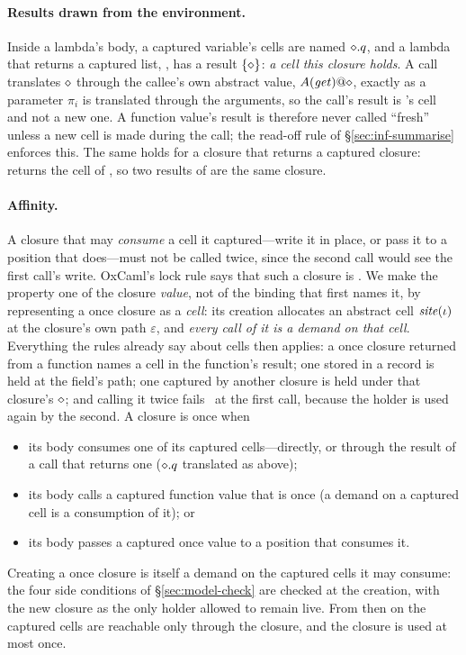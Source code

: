 \paragraph{Results drawn from the environment.} Inside a lambda's body, a captured variable's cells
are named $\diamond.q$, and a lambda that returns a captured list, , has a result
$\{\diamond\}$: \emph{a cell this closure holds}. A call  translates $\diamond$ through the callee's
own abstract value, $A(\mathit{get})@\diamond$, exactly as a parameter $\pi_i$ is translated through the
arguments, so the call's result is 's cell and not a new one. A function value's result is
therefore never called ``fresh'' unless a new cell is made during the call; the read-off rule of
\S\ref{sec:inf-summarise} enforces this. The same holds for a closure that returns a captured closure:
 returns the cell of , so two results of  are the same
closure.

\paragraph{Affinity.} A closure that may \emph{consume} a cell it captured---write it in place, or
pass it to a position that does---must not be called twice, since the second call would see the
first call's write. OxCaml's lock rule says that such a closure is 
\citep[\S3.3]{lorenzen2024oxidizing}. We make the property one of the closure \emph{value}, not of
the binding that first names it, by representing a once closure as a \emph{cell}: its creation
allocates an abstract cell $\mathit{site}(\iota)$ at the closure's own path $\varepsilon$, and \emph{every call
of it is a demand on that cell}. Everything the rules already say about cells then applies: a once
closure returned from a function names a cell in the function's result; one stored in a record is held
at the field's path; one captured by another closure is held under that closure's $\diamond$; and calling
it twice fails \Dead\ at the first call, because the holder is used again by the second. A closure is
once when
\begin{itemize}
\item its body consumes one of its captured cells---directly, or through the result of a call that
returns one ($\diamond.q$ translated as above);
\item its body calls a captured function value that is once (a demand on a captured cell is a
consumption of it); or
\item its body passes a captured once value to a position that consumes it.
\end{itemize}
Creating a once closure is itself a demand on the captured cells it may consume: the four side
conditions of \S\ref{sec:model-check} are checked at the creation, with the new closure as the only
holder allowed to remain live. From then on the captured cells are reachable only through the
closure, and the closure is used at most once.

